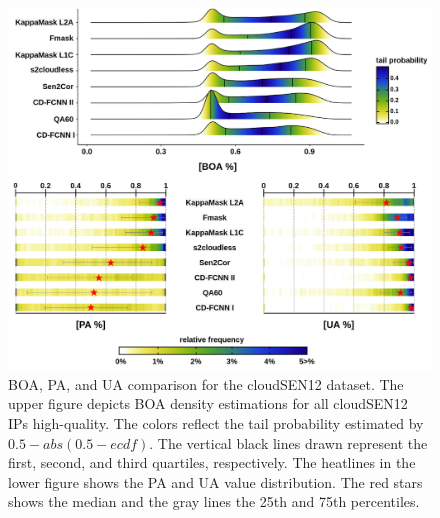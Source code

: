 \documentclass[a4paper, nobind]{templates/cdethesis}
\begin{document}
\begin{figure}[!h]
    \centering
    \includegraphics[width=0.98\linewidth]{figures/chapter02/figure04.png}
    \caption{
    BOA, PA, and UA comparison for the cloudSEN12 dataset. The upper figure depicts BOA density estimations for all cloudSEN12 IPs high-quality. The colors reflect the tail probability estimated by $0.5 - abs(0.5 - ecdf)$. The vertical black lines drawn represent the first, second, and third quartiles, respectively.
    The heatlines in the lower figure shows the PA and UA value distribution. The red stars shows the median and the gray lines the 25th and 75th percentiles.
    }
    \label{fig:figurexx01}
\end{figure}
\end{document}
